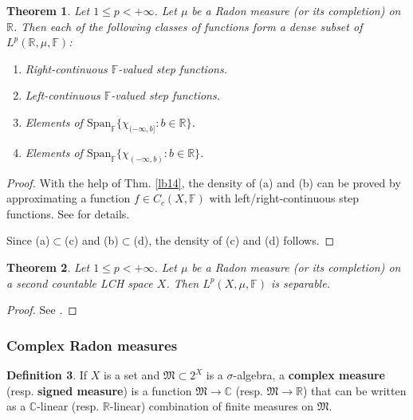 \documentclass[12pt,b5paper,notitlepage]{article}
\theoremstyle{definition}
\newtheorem{df}{Definition}[subsection]
\theoremstyle{plain}
\newtheorem{thm}[df]{Theorem}
\newcommand{\fk}{\mathfrak}
\newcommand{\Span}{\mathrm{Span}}
\newcommand{\Cbb}{\mathbb C}
\newcommand{\Rbb}{\mathbb R}
\newcommand{\Fbb}{\mathbb F}
\numberwithin{equation}{section}
\begin{document}
\begin{thm}\label{lb77}
Let $1\leq p<+\infty$. Let $\mu$ be a Radon measure (or its completion) on $\Rbb$. Then each of the following classes of functions form a dense subset of $L^p(\Rbb,\mu,\Fbb)$:
\begin{enumerate}[label=(\alph*)]
\item Right-continuous $\Fbb$-valued step functions.
\item Left-continuous $\Fbb$-valued step functions.
\item Elements of $\Span_\Fbb\{\chi_{(-\infty,b]}:b\in\Rbb\}$.
\item Elements of $\Span_\Fbb\{\chi_{(-\infty,b)}:b\in\Rbb\}$.
\end{enumerate}
\end{thm}

\begin{proof}
With the help of Thm. \ref{lb14}, the density of (a) and (b) can be proved by approximating a function $f\in C_c(X,\Fbb)$ with left/right-continuous step functions. See \cite[Sec. 27.2]{Gui-A} for details.

Since (a)$\subset$(c) and (b)$\subset$(d), the density of (c) and (d) follows.
\end{proof}




\begin{thm}\label{lb85}
Let $1\leq p<+\infty$. Let $\mu$ be a Radon measure (or its completion) on a second countable LCH space $X$. Then $L^p(X,\mu,\Fbb)$ is separable.
\end{thm}


\begin{proof}
See \cite[Sec. 27.2]{Gui-A}.
\end{proof}






\subsubsection{Complex Radon measures}


\begin{df}
If $X$ is a set and $\fk M\subset 2^X$ is a $\sigma$-algebra, a \textbf{complex measure}  (resp. \textbf{signed measure})  is a function $\fk M\rightarrow \Cbb$ (resp. $\fk M\rightarrow\Rbb$) that can be written as a $\Cbb$-linear (resp. $\Rbb$-linear) combination of finite measures on $\fk M$.
\end{df}
\end{document}
